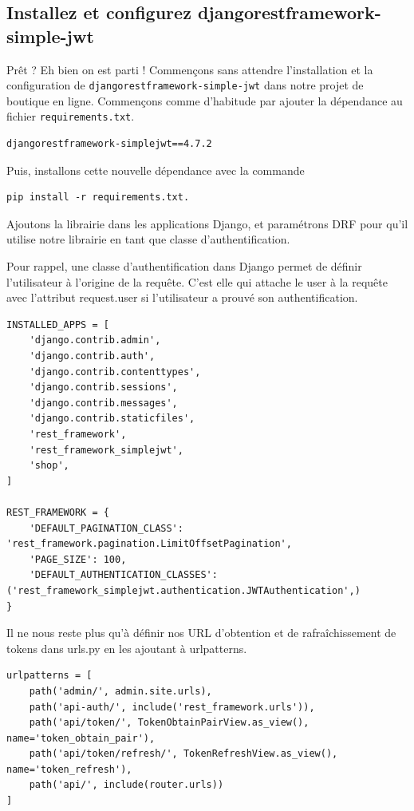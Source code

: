 \documentclass[a4paper]{article}
\begin{document}
\subsection{Installez et configurez djangorestframework-simple-jwt}
Prêt ? Eh bien on est parti ! Commençons sans attendre l’installation et la configuration de {\tt djangorestframework-simple-jwt}  dans notre projet de boutique en ligne. Commençons comme d’habitude par ajouter la dépendance au fichier {\tt requirements.txt}.
\begin{verbatim}
djangorestframework-simplejwt==4.7.2
\end{verbatim}
Puis, installons cette nouvelle dépendance avec la commande 
\begin{verbatim}
pip install -r requirements.txt.
\end{verbatim}
Ajoutons la librairie dans les applications Django, et paramétrons DRF pour qu’il utilise notre librairie en tant que classe d’authentification.
\begin{theorem}
Pour rappel, une classe d’authentification dans Django permet de définir l’utilisateur à l’origine de la requête. C’est elle qui attache le user  à la requête avec l’attribut request.user  si l'utilisateur a prouvé son authentification.
\end{theorem}
\begin{verbatim}
INSTALLED_APPS = [
    'django.contrib.admin',
    'django.contrib.auth',
    'django.contrib.contenttypes',
    'django.contrib.sessions',
    'django.contrib.messages',
    'django.contrib.staticfiles',
    'rest_framework',
    'rest_framework_simplejwt',
    'shop',
]
 
REST_FRAMEWORK = {
    'DEFAULT_PAGINATION_CLASS': 'rest_framework.pagination.LimitOffsetPagination',
    'PAGE_SIZE': 100,
    'DEFAULT_AUTHENTICATION_CLASSES': ('rest_framework_simplejwt.authentication.JWTAuthentication',)
}
\end{verbatim}
Il ne nous reste plus qu’à définir nos URL d’obtention et de rafraîchissement de tokens dans urls.py  en les ajoutant à urlpatterns.
\begin{verbatim}
urlpatterns = [
    path('admin/', admin.site.urls),
    path('api-auth/', include('rest_framework.urls')),
    path('api/token/', TokenObtainPairView.as_view(), name='token_obtain_pair'),
    path('api/token/refresh/', TokenRefreshView.as_view(), name='token_refresh'),
    path('api/', include(router.urls))
]
\end{verbatim}
\end{document}
